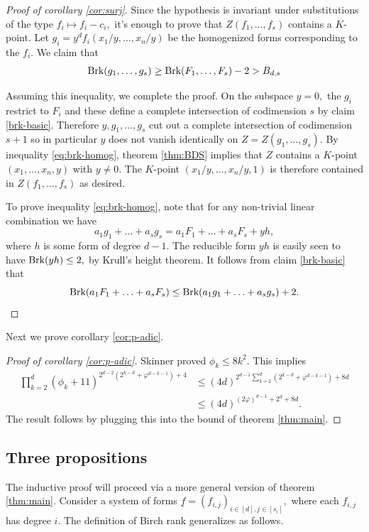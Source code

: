 \documentclass[12pt]{amsart}
\let\ul\underline
\theoremstyle{definition}
\newcommand{\brk}{\textnormal{Brk}}
\let\ul\underline
\begin{document}
\begin{proof}[Proof of corollary \ref{cor:surj}]
Since the hypothesis is invariant under substitutions of the type $f_i\mapsto f_i-c_i,$ it's enough to prove that $Z(f_1,\ldots,f_s)$ contains a $K$-point. Let $g_i = y^d f_i(x_1/y,\ldots,x_n/y)$ be the homogenized forms corresponding to the $f_i.$ We claim that 
\begin{equation}\label{eq:brk-homog}
    \brk(g_1,\ldots,g_s) \ge \brk(F_1,\ldots,F_s) -2 > B_{d,s}
\end{equation}

Assuming this inequality, we complete the proof. On the subspace $y=0,$ the $g_i$ restrict to $F_i$ and these define a complete intersection of codimension $s$ by claim \ref{brk-basic}. Therefore $y,g_1,\ldots,g_s$ cut out a complete intersection of codimension $s+1$ so in particular $y$ does not vanish identically on $Z = Z(g_1,\ldots,g_s).$ By inequality \eqref{eq:brk-homog}, theorem \ref{thm:BDS} implies that $Z$ contains a $K$-point $(x_1,\ldots,x_n,y)$ with $y\neq 0.$ The $K$-point $(x_1/y,\ldots,x_n/y,1)$ is therefore contained in $Z(f_1,\ldots,f_s)$ as desired.    

To prove inequality \eqref{eq:brk-homog}, note that for any non-trivial linear combination we have 
\[
a_1g_1+\ldots+a_sg_s = a_1F_1+\ldots+a_sF_s + yh,
\]
where $h$ is some form of degree $d-1.$ The reducible form $yh$ is easily seen to have $\brk(yh) \le 2,$ by Krull's height theorem. It follows from claim \ref{brk-basic} that 
\[
\brk(a_1F_1+\ldots+a_sF_s) \le \brk(a_1g_1+\ldots+a_sg_s) +2.
\]
\end{proof}




Next we prove corollary \ref{cor:p-adic}.

\begin{proof}[Proof of corollary \ref{cor:p-adic}]
    Skinner proved \cite{Skinner-phi}  $\phi_k \le 8k^2.$ This implies 
    \begin{align*}
         \prod_{k=2}^d (\phi_k+11)^{2^{d-2}(2^{k-d}+\varphi^{d-k-1})+4} &\le           (4d)^{2^{d-1} \sum_{k=2}^d (2^{k-d}+\varphi^{d-k-1}) +8d} \\
         &\le (4d)^{(2\varphi)^{d-1} + 2^d +8d}. 
    \end{align*}
    The result follows by plugging this into the bound of theorem \ref{thm:main}.
\end{proof}

\subsection{Three propositions}
The inductive proof will proceed via a more general version of theorem \ref{thm:main}. Consider a system of forms $\ul{f} = (f_{i,j})_{i\in [d],j\in [s_i]},$ where each $f_{i,j}$ has degree $i.$ The definition of Birch rank generalizes as follows.
\end{document}
